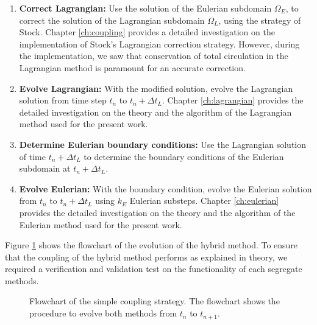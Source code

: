 		\begin{enumerate}
		\item \textbf{Correct Lagrangian:} Use the solution of the Eulerian subdomain $\Omega_E$, to correct the solution of the Lagrangian subdomain $\Omega_L$, using the strategy of Stock. Chapter \ref{ch:coupling} provides a detailed investigation on the implementation of Stock's Lagrangian correction strategy. However, during the implementation, we saw that conservation of total circulation in the Lagrangian method is paramount for an accurate correction.
		
		\item \textbf{Evolve Lagrangian:} With the modified solution, evolve the Lagrangian solution from time step $t_n$ to $t_{n}+\Delta t_L$. Chapter \ref{ch:lagrangian} provides the detailed investigation on the theory and the algorithm of the Lagrangian method used for the present work.
		
		\item \textbf{Determine Eulerian boundary conditions:} Use the Lagrangian solution of time $t_{n}+\Delta t_L$ to determine the boundary conditions of the Eulerian subdomain at $t_{n}+\Delta t_L$.
		
		\item \textbf{Evolve Eulerian:} With the boundary condition, evolve the Eulerian solution from $t_n$ to $t_{n}+\Delta t_L$ using $k_E$ Eulerian substeps. Chapter \ref{ch:eulerian} provides the detailed investigation on the theory and the algorithm of the Eulerian method used for the present work.
		\end{enumerate}
	
	Figure \ref{fig:flowchart_simpleCoupling} shows the flowchart of the evolution of the hybrid method. To ensure that the coupling of the hybrid method performs as explained in theory, we required a verification and validation test on the functionality of each segregate methods.
	
	
	\begin{figure}[!t]
		\centering
		\caption{Flowchart of the simple coupling strategy. The flowchart shows the procedure to evolve both methods from $t_n$ to $t_{n+1}$.}
		\label{fig:flowchart_simpleCoupling}
	\end{figure}




